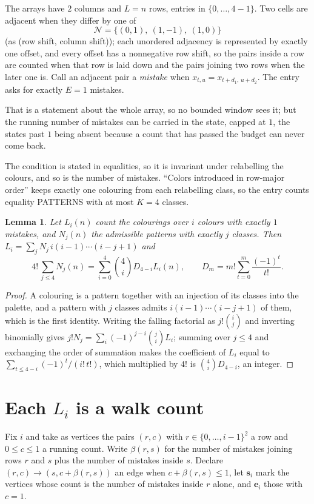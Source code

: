 \documentclass[11pt,a4paper]{article}
\theoremstyle{plain}
\newtheorem{lemma}[theorem]{Lemma}
\theoremstyle{definition}
\begin{document}
The arrays have $2$ columns and $L=n$ rows, entries in $\{0,\dots,4-1\}$.
Two cells are adjacent when they differ by one of
\[
\mathcal N=\{(0,1),\ (1,-1),\ (1,0)\}
\]
(as (row shift, column shift)); each unordered adjacency is represented by exactly one
offset, and every offset has a nonnegative row shift, so the pairs inside a row are
counted when that row is laid down and the pairs joining two rows when the later one
is. Call an adjacent pair a \emph{mistake} when $x_{t,u}=x_{t+d_1,\,u+d_2}$. The entry asks for exactly
$E=1$ mistakes.

That is a statement about the whole array, so no bounded window sees it; but the running
number of mistakes can be carried in the state, capped at $1$, the states past $1$ being
absent because a count that has passed the budget can never come back.

The condition is stated in equalities, so it is invariant under relabelling the colours, and
so is the number of mistakes. ``Colors introduced in row-major order'' keeps exactly one
colouring from each relabelling class, so the entry counts equality PATTERNS with at most
$K=4$ classes.

\begin{lemma}\label{lem:inv}
Let $L_i(n)$ count the colourings over $i$ colours with exactly $1$ mistakes, and $N_j(n)$
the admissible patterns with exactly $j$ classes. Then
$L_i=\sum_j N_j\,i(i-1)\cdots(i-j+1)$ and
\[
4!\,\sum_{j\le4}N_j(n)=\sum_{i=0}^{4}\binom{4}{i}D_{4-i}L_i(n),
\qquad D_m=m!\sum_{t=0}^{m}\frac{(-1)^t}{t!} .
\]
\end{lemma}

\begin{proof}
A colouring is a pattern together with an injection of its classes into the palette, and a
pattern with $j$ classes admits $i(i-1)\cdots(i-j+1)$ of them, which is the first identity.
Writing the falling factorial as $j!\binom{i}{j}$ and inverting binomially gives
$j!N_j=\sum_i(-1)^{j-i}\binom{j}{i}L_i$; summing over $j\le4$ and exchanging the order
of summation makes the coefficient of $L_i$ equal to $\sum_{t\le4-i}(-1)^t/(i!\,t!)$,
which multiplied by $4!$ is $\binom{4}{i}D_{4-i}$, an integer.
\end{proof}

\section{Each $L_i$ is a walk count}

Fix $i$ and take as vertices the pairs $(r,c)$ with $r\in\{0,\dots,i-1\}^{2}$ a row
and $0\le c\le1$ a running count. Write $\beta(r,s)$ for the number of mistakes joining
rows $r$ and $s$ plus the number of mistakes inside $s$. Declare $(r,c)\to(s,c+\beta(r,s))$
an edge when $c+\beta(r,s)\le1$, let $\mathbf{s}_i$ mark the vertices whose count is the
number of mistakes inside $r$ alone, and $\mathbf{e}_i$ those with $c=1$.
\end{document}
